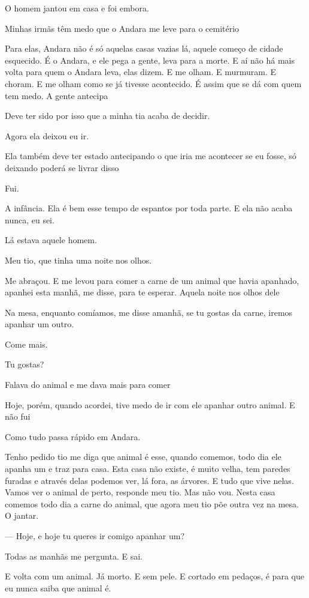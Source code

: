 O homem jantou em casa e foi embora.

Minhas irmãs têm medo que o Andara me leve para o cemitério

Para elas, Andara não é só aquelas casas vazias lá, aquele começo de
cidade esquecido. É o Andara, e ele pega a gente, leva para a morte. E
aí não há mais volta para quem o Andara leva, elas dizem. E me olham. E
murmuram. E choram. E me olham como se já tivesse acontecido. É assim
que se dá com quem tem medo. A gente antecipa

Deve ter sido por isso que a minha tia acaba de decidir.

Agora ela deixou eu ir.

Ela também deve ter estado antecipando o que iria me acontecer se eu
fosse, só deixando poderá se livrar disso

Fui.

A infância. Ela é bem esse tempo de espantos por toda parte. E ela não
acaba nunca, eu sei.

Lá estava aquele homem.

Meu tio, que tinha uma noite nos olhos.

Me abraçou. E me levou para comer a carne de um animal que havia
apanhado, apanhei esta manhã, me disse, para te esperar. Aquela noite
nos olhos dele

Na mesa, enquanto comíamos, me disse amanhã, se tu gostas da carne,
iremos apanhar um outro.

Come mais.

Tu gostas?

Falava do animal e me dava mais para comer

Hoje, porém, quando acordei, tive medo de ir com ele apanhar outro
animal. E não fui

Como tudo passa rápido em Andara.

Tenho pedido tio me diga que animal é esse, quando comemos, todo dia ele
apanha um e traz para casa. Esta casa não existe, é muito velha, tem
paredes furadas e através delas podemos ver, lá fora, as árvores. E tudo
que vive nelas. Vamos ver o animal de perto, responde meu tio. Mas não
vou. Nesta casa comemos todo dia a carne do animal, que agora meu tio
põe outra vez na mesa. O jantar.

--- Hoje, e hoje tu queres ir comigo apanhar um?

Todas as manhãs me pergunta. E sai.

E volta com um animal. Já morto. E sem pele. E cortado em pedaços, é
para que eu nunca saiba que animal é.

